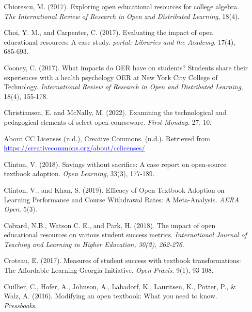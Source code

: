 \documentclass[11pt]{article}
\newcommand{\alink}[2]{\href{#1}{\textcolor{blue}{#2}}}
\begin{document}
\begin{thebibliography}{99}
   Chiorescu, M. (2017). Exploring open educational resources for college algebra. {\em The International Review of Research in Open and Distributed Learning}, 18(4).

   Choi, Y. M., and Carpenter, C. (2017). Evaluating the impact of open educational resources: A case study. {\em portal: Libraries and the Academy}, 17(4), 685-693.

   Cooney, C. (2017). What impacts do OER have on students? Students share their experiences with a health psychology OER at New York City College of Technology. {\em International Review of Research in Open and Distributed Learning}, 18(4), 155-178.

   Christiansen, E. and McNally, M. (2022). Examining the technological and pedagogical elements of select open courseware. {\em First Monday}. 27, 10.%

   About CC Licenses (n.d.), Creative Commons. (n.d.). Retrieved from \alink{https://creativecommons.org/about/cclicenses/}{https://creativecommons.org/about/cclicenses/}

   Clinton, V. (2018). Savings without sacrifice: A case report on open-source textbook adoption. {\em Open Learning}, 33(3), 177-189.

   Clinton, V., and Khan, S. (2019). Efficacy of Open Textbook Adoption on Learning Performance and Course Withdrawal Rates: A Meta-Analysis. {\em AERA Open}, 5(3).%

 Colvard, N.\/B., Watson C.\/ E., and Park, H. (2018). The impact of open educational resources on various student success metrics. {\em International Journal of Teaching and Learning in Higher Education, 30(2), 262-276}.

 Croteau, E. (2017). Measures of student success with textbook transformations: The Affordable Learning Georgia Initiative. {\em Open Praxis}. 9(1), 93-108.

   Cuillier, C., Hofer, A., Johnson, A., Labadorf, K., Lauritsen, K., Potter, P., \& Walz, A. (2016). Modifying an open textbook: What you need to know.  {\em Pressbooks}.%


\end{thebibliography}
\end{document}
